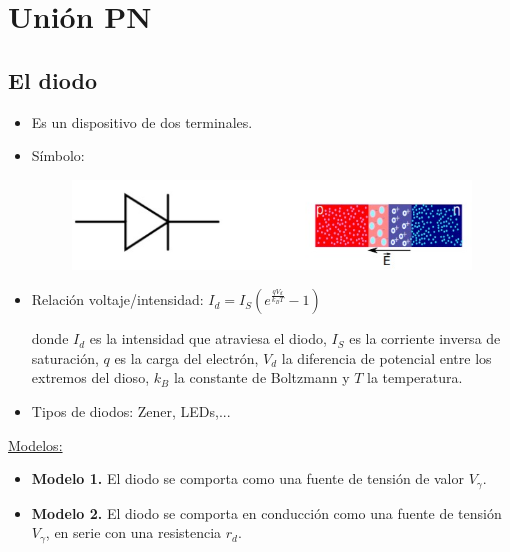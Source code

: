 \documentclass[10pt,a4paper]{article}
\begin{document}
	\section{Unión PN}
	\subsection{El diodo}
	
	\begin{itemize}
		\item Es un dispositivo de dos terminales.
		\item Símbolo:
		\begin{figure}[h]
			\centering
			\includegraphics[scale = 0.4]{diodo}
		\end{figure}
		\item Relación voltaje/intensidad: $I_d = I_S\left(e^{\tfrac{qV_d}{k_B T}} - 1 \right)$
		
		donde $I_d$ es la intensidad que atraviesa el diodo, $I_S$ es la corriente inversa de saturación, $q$ es la carga del electrón, $V_d$ la diferencia de potencial entre los extremos del dioso, $k_B$ la constante de Boltzmann y $T$ la temperatura.
		\item Tipos de diodos: Zener, LEDs,...
	\end{itemize}

	\underline{Modelos:}
	\begin{itemize}
		\item \textbf{Modelo 1.} El diodo se comporta como una fuente de tensión de valor $V_\gamma$.
		\item \textbf{Modelo 2.} El diodo se comporta en conducción como una fuente de tensión $V_\gamma$, en serie con una resistencia $r_d$.
	\end{itemize}
	
\end{document}

